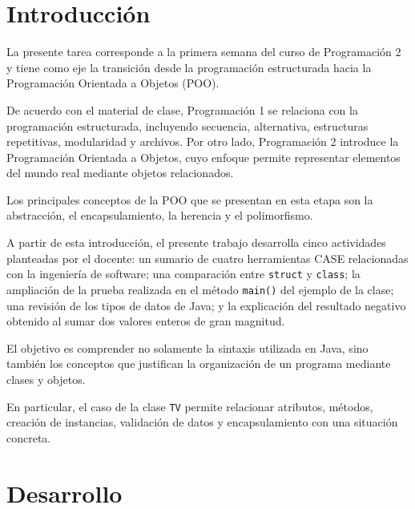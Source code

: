 \documentclass[12pt,a4paper]{article}
\begin{document}
\tableofcontents

\newpage


\section{Introducción}

La presente tarea corresponde a la primera semana del curso de
Programación 2 y tiene como eje la transición desde la programación
estructurada hacia la Programación Orientada a Objetos (POO).

De acuerdo con el material de clase, Programación 1 se relaciona con
la programación estructurada, incluyendo secuencia, alternativa,
estructuras repetitivas, modularidad y archivos. Por otro lado,
Programación 2 introduce la Programación Orientada a Objetos, cuyo
enfoque permite representar elementos del mundo real mediante
objetos relacionados.

Los principales conceptos de la POO que se presentan en esta etapa
son la abstracción, el encapsulamiento, la herencia y el polimorfismo.

A partir de esta introducción, el presente trabajo desarrolla cinco
actividades planteadas por el docente: un sumario de cuatro
herramientas CASE relacionadas con la ingeniería de software; una
comparación entre \texttt{struct} y \texttt{class}; la ampliación de
la prueba realizada en el método \texttt{main()} del ejemplo de la
clase; una revisión de los tipos de datos de Java; y la explicación
del resultado negativo obtenido al sumar dos valores enteros de gran
magnitud.

El objetivo es comprender no solamente la sintaxis utilizada en
Java, sino también los conceptos que justifican la organización de
un programa mediante clases y objetos.

En particular, el caso de la clase \texttt{TV} permite relacionar
atributos, métodos, creación de instancias, validación de datos y
encapsulamiento con una situación concreta.


\section{Desarrollo}
\end{document}
